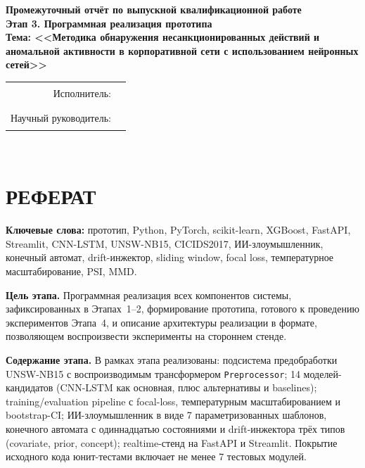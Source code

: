 \documentclass[14pt, a4paper]{extarticle}
\begin{document}
\begin{titlepage}
\centering
\vspace*{1cm}
{\large\bfseries Промежуточный отчёт по выпускной квалификационной работе}\\[0.3cm]
{\large\bfseries Этап 3. Программная реализация прототипа}\\[2cm]
{\Large\bfseries Тема: <<Методика обнаружения несанкционированных действий
и аномальной активности в корпоративной сети с использованием нейронных
сетей>>}\\[3cm]
\begin{flushright}
\begin{tabular}{rl}
Исполнитель: & \rule{6cm}{0.4pt} \\[0.3cm]
Научный руководитель: & \rule{6cm}{0.4pt} \\
\end{tabular}
\end{flushright}
\vfill
{\large \the\year}\\
\end{titlepage}

\section*{РЕФЕРАТ}

\textbf{Ключевые слова:} прототип, Python, PyTorch, scikit-learn, XGBoost,
FastAPI, Streamlit, CNN-LSTM, UNSW-NB15, CICIDS2017, ИИ-злоумышленник,
конечный автомат, drift-инжектор, sliding window, focal loss, температурное
масштабирование, PSI, MMD.

\textbf{Цель этапа.} Программная реализация всех компонентов системы,
зафиксированных в Этапах~1--2, формирование прототипа, готового к
проведению экспериментов Этапа~4, и описание архитектуры реализации в
формате, позволяющем воспроизвести эксперименты на стороннем стенде.

\textbf{Содержание этапа.} В рамках этапа реализованы: подсистема
предобработки UNSW-NB15 с воспроизводимым трансформером \texttt{Preprocessor};
14 моделей-кандидатов (CNN-LSTM как основная, плюс альтернативы и baselines);
training/evaluation pipeline с focal-loss, температурным масштабированием
и bootstrap-CI; ИИ-злоумышленник в виде 7 параметризованных шаблонов,
конечного автомата с одиннадцатью состояниями и drift-инжектора трёх типов
(covariate, prior, concept); realtime-стенд на FastAPI и Streamlit. Покрытие
исходного кода юнит-тестами включает не менее 7 тестовых модулей.
\end{document}

